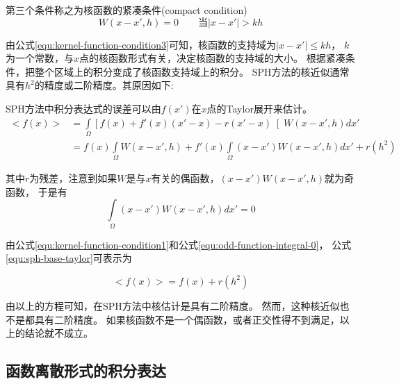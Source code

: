 第三个条件称之为核函数的紧凑条件(compact condition)
\begin{equation}
\label{equ:kernel-function-condition3}
W(x-x',h) = 0 \qquad \text{当}|x-x'| > kh
\end{equation}

由公式\ref{equ:kernel-function-condition3}可知，核函数的支持域为$|x-x'|\le{}kh$，
$k$为一个常数，与$x$点的核函数形式有关，决定核函数的支持域的大小。
根据紧凑条件，把整个区域上的积分变成了核函数支持域上的积分。
SPH方法的核近似通常具有$h^2$的精度或二阶精度。其原因如下:

SPH方法中积分表达式的误差可以由$f(x')$在$x$点的Taylor展开来估计。
\begin{equation}
\label{equ:sph-base-taylor}
\begin{aligned}
< f(x) > & = \int\limits_\Omega{}\left[ f(x) + f'(x)(x'-x) -r(x'-x) \right[{} 
			W(x-x',h)dx'\\
		 & = f (x)\int\limits_\Omega{}W(x-x',h)+
		     f'(x)\int\limits_\Omega{}(x-x')W(x-x',h)dx' + r(h^2)
\end{aligned}
\end{equation}


其中$r$为残差，注意到如果$W$是与$x$有关的偶函数，$(x-x')W(x-x',h)$就为奇函数，
于是有
\begin{equation}
\label{equ:odd-function-integral-0}
\int\limits_\Omega{}(x-x')W(x-x',h)dx' = 0
\end{equation}

由公式\ref{equ:kernel-function-condition1}和公式\ref{equ:odd-function-integral-0}，
公式\ref{equ:sph-base-taylor}可表示为

\begin{equation}
\label{equ:shp-function-recursion}
<f(x)> = f(x) +r(h^2)
\end{equation}

由以上的方程可知，在SPH方法中核估计是具有二阶精度。
然而，这种核近似也不是都具有二阶精度。
如果核函数不是一个偶函数，或者正交性得不到满足，以上的结论就不成立。

\subsection{函数离散形式的积分表达}
\label{subsec:fun-dis-int-equ}

